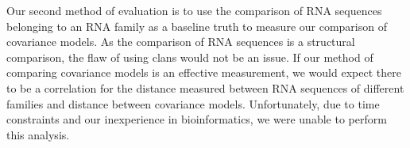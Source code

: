 Our second method of evaluation is to use the comparison of RNA sequences belonging to an RNA family as a baseline truth to measure our comparison of covariance models.
As the comparison of RNA sequences is a structural comparison, the flaw of using clans would not be an issue.
If our method of comparing covariance models is an effective measurement, we would expect there to be a correlation for the distance measured between RNA sequences of different families and distance between covariance models.
Unfortunately, due to time constraints and our inexperience in bioinformatics, we were unable to perform this analysis.